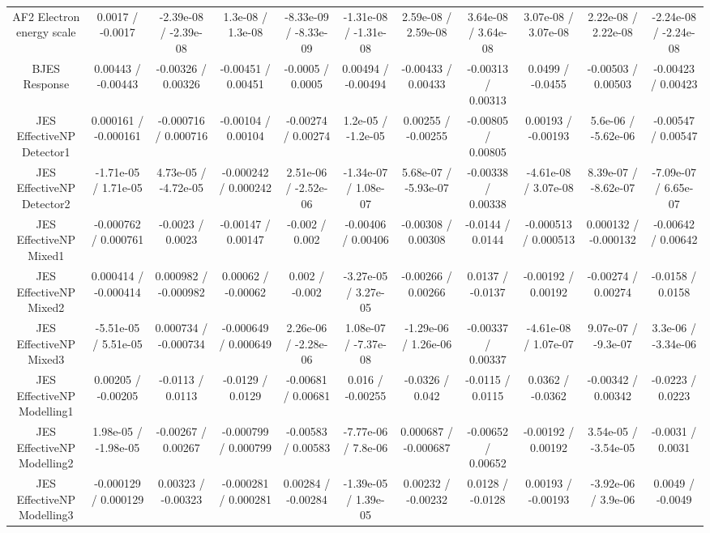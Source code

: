 \begin{table}[htbp]
\begin{center}
\begin{tabular}{|c|c|c|c|c|c|c|c|c|c|c|}
  AF2 Electron energy scale & 0.0017 / -0.0017 & -2.39e-08 / -2.39e-08 & 1.3e-08 / 1.3e-08 & -8.33e-09 / -8.33e-09 & -1.31e-08 / -1.31e-08 & 2.59e-08 / 2.59e-08 & 3.64e-08 / 3.64e-08 & 3.07e-08 / 3.07e-08 & 2.22e-08 / 2.22e-08 & -2.24e-08 / -2.24e-08 \\ 
  BJES Response & 0.00443 / -0.00443 & -0.00326 / 0.00326 & -0.00451 / 0.00451 & -0.0005 / 0.0005 & 0.00494 / -0.00494 & -0.00433 / 0.00433 & -0.00313 / 0.00313 & 0.0499 / -0.0455 & -0.00503 / 0.00503 & -0.00423 / 0.00423 \\ 
  JES EffectiveNP Detector1 & 0.000161 / -0.000161 & -0.000716 / 0.000716 & -0.00104 / 0.00104 & -0.00274 / 0.00274 & 1.2e-05 / -1.2e-05 & 0.00255 / -0.00255 & -0.00805 / 0.00805 & 0.00193 / -0.00193 & 5.6e-06 / -5.62e-06 & -0.00547 / 0.00547 \\ 
  JES EffectiveNP Detector2 & -1.71e-05 / 1.71e-05 & 4.73e-05 / -4.72e-05 & -0.000242 / 0.000242 & 2.51e-06 / -2.52e-06 & -1.34e-07 / 1.08e-07 & 5.68e-07 / -5.93e-07 & -0.00338 / 0.00338 & -4.61e-08 / 3.07e-08 & 8.39e-07 / -8.62e-07 & -7.09e-07 / 6.65e-07 \\ 
  JES EffectiveNP Mixed1 & -0.000762 / 0.000761 & -0.0023 / 0.0023 & -0.00147 / 0.00147 & -0.002 / 0.002 & -0.00406 / 0.00406 & -0.00308 / 0.00308 & -0.0144 / 0.0144 & -0.000513 / 0.000513 & 0.000132 / -0.000132 & -0.00642 / 0.00642 \\ 
  JES EffectiveNP Mixed2 & 0.000414 / -0.000414 & 0.000982 / -0.000982 & 0.00062 / -0.00062 & 0.002 / -0.002 & -3.27e-05 / 3.27e-05 & -0.00266 / 0.00266 & 0.0137 / -0.0137 & -0.00192 / 0.00192 & -0.00274 / 0.00274 & -0.0158 / 0.0158 \\ 
  JES EffectiveNP Mixed3 & -5.51e-05 / 5.51e-05 & 0.000734 / -0.000734 & -0.000649 / 0.000649 & 2.26e-06 / -2.28e-06 & 1.08e-07 / -7.37e-08 & -1.29e-06 / 1.26e-06 & -0.00337 / 0.00337 & -4.61e-08 / 1.07e-07 & 9.07e-07 / -9.3e-07 & 3.3e-06 / -3.34e-06 \\ 
  JES EffectiveNP Modelling1 & 0.00205 / -0.00205 & -0.0113 / 0.0113 & -0.0129 / 0.0129 & -0.00681 / 0.00681 & 0.016 / -0.00255 & -0.0326 / 0.042 & -0.0115 / 0.0115 & 0.0362 / -0.0362 & -0.00342 / 0.00342 & -0.0223 / 0.0223 \\ 
  JES EffectiveNP Modelling2 & 1.98e-05 / -1.98e-05 & -0.00267 / 0.00267 & -0.000799 / 0.000799 & -0.00583 / 0.00583 & -7.77e-06 / 7.8e-06 & 0.000687 / -0.000687 & -0.00652 / 0.00652 & -0.00192 / 0.00192 & 3.54e-05 / -3.54e-05 & -0.0031 / 0.0031 \\ 
  JES EffectiveNP Modelling3 & -0.000129 / 0.000129 & 0.00323 / -0.00323 & -0.000281 / 0.000281 & 0.00284 / -0.00284 & -1.39e-05 / 1.39e-05 & 0.00232 / -0.00232 & 0.0128 / -0.0128 & 0.00193 / -0.00193 & -3.92e-06 / 3.9e-06 & 0.0049 / -0.0049 \\ 

\end{tabular}
\end{center}
\end{table}
